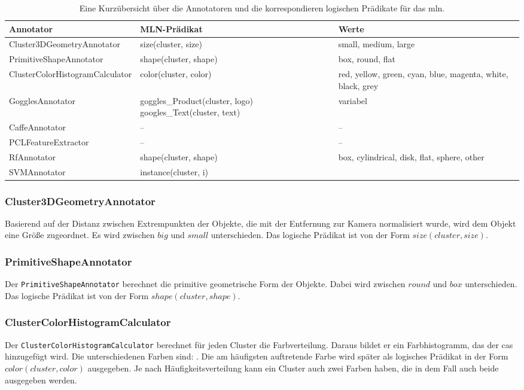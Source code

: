 \begin{table}
\begin{tabularx}{\textwidth}{lXX}
\textbf{Annotator}				& \textbf{MLN-Prädikat}	& \textbf{Werte}	\\ \hline 
Cluster3DGeometryAnnotator		& size(cluster, size)	& small, medium, large	\\ \hline 
PrimitiveShapeAnnotator			& shape(cluster, shape)	& box, round, flat 	\\ \hline 
ClusterColorHistogramCalculator  & color(cluster, color)	& red, yellow, green, cyan, blue, magenta, white, black, grey \\ \hline 
GogglesAnnotator				& goggles\_Product(cluster, logo) \newline googles\_Text(cluster, text) 	& 	variabel	\\ \hline 
CaffeAnnotator					& --					& --	\\ \hline 
PCLFeatureExtractor				& --					& --	\\ \hline 
RfAnnotator						& shape(cluster, shape)	&	box, cylindrical, disk, flat, sphere, other	\\ \hline 
SVMAnnotator					& instance(cluster, i)	&		\\ \hline 
\end{tabularx}
\caption[Kurzübersicht der Annotatoren]{Eine Kurzübersicht über die Annotatoren und die korrespondieren logischen Prädikate für das \gls{mln}.}
\label{tab:annotators}
\end{table}

\subsubsection{Cluster3DGeometryAnnotator}
Basierend auf der Distanz zwischen Extrempunkten der Objekte, die mit der Entfernung zur Kamera normalisiert wurde, wird dem Objekt eine Größe zugeordnet. Es wird zwischen $big$ und $small$ unterschieden. Das logische Prädikat ist von der Form $size(cluster,  size)$. 

\subsubsection{PrimitiveShapeAnnotator} 
Der \texttt{PrimitiveShapeAnnotator} berechnet die primitive geometrische Form der Objekte.  Dabei wird zwischen $round$ und $box$ unterschieden. Das logische Prädikat ist von der Form $shape(cluster,  shape)$.
   
\subsubsection{ClusterColorHistogramCalculator}
Der \texttt{ClusterColorHistogramCalculator} berechnet für jeden Cluster die Farbverteilung. Daraus bildet er ein Farbhistogramm, das der \gls{cas} hinzugefügt wird. Die unterschiedenen Farben sind: . Die am häufigsten auftretende Farbe wird später als logisches Prädikat in der Form $color(cluster,  color)$ ausgegeben. Je nach Häufigkeitsverteilung kann ein Cluster auch zwei Farben haben, die in dem Fall auch beide ausgegeben werden. 

